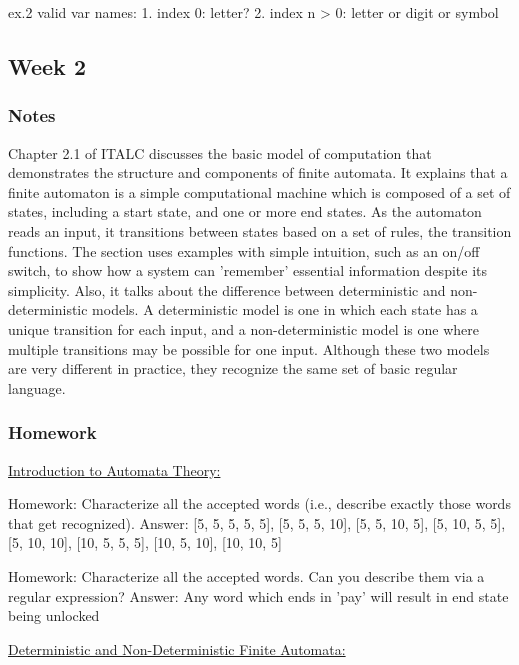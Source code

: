 \documentclass{article}
\theoremstyle{theorem}
\theoremstyle{definition}
\theoremstyle{remark}
\begin{document}
ex.2 valid var names:
1. index 0: letter?
2. index n > 0: letter or digit or symbol

\subsection{Week 2}

\subsubsection*{Notes}

Chapter 2.1 of ITALC discusses the basic model of computation that demonstrates the structure and components of finite automata. It explains that a finite automaton is a simple computational machine which is composed of a set of states, including a start state, and one or more end states. As the automaton reads an input, it transitions between states based on a set of rules, the transition functions. The section uses examples with simple intuition, such as an on/off switch, to show how a system can 'remember' essential information despite its simplicity. Also, it talks about the difference between deterministic and non-deterministic models. A deterministic model is one in which each state has a unique transition for each input, and a non-deterministic model is one where multiple transitions may be possible for one input. Although these two models are very different in practice, they recognize the same set of basic regular language. 

\subsubsection*{Homework}

\underline{Introduction to Automata Theory:}

Homework: Characterize all the accepted words (i.e., describe exactly those words that get recognized).\newline
Answer:  [5, 5, 5, 5, 5], [5, 5, 5, 10], [5, 5, 10, 5], [5, 10, 5, 5], [5, 10, 10], [10, 5, 5, 5], [10, 5, 10], [10, 10, 5]

Homework: Characterize all the accepted words. Can you describe them via a regular expression?\newline
Answer: Any word which ends in 'pay' will result in end state being unlocked

\underline{Deterministic and Non-Deterministic Finite Automata:}
\end{document}
